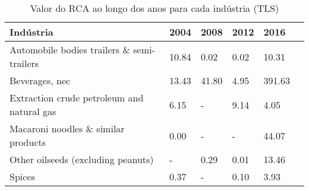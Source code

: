 \begin{table}
\centering
\caption{Valor do RCA ao longo dos anos para cada indústria (TLS)}
\begin{tabular}{p{6cm}p{1.5cm}p{1.5cm}p{1.5cm}p{1.5cm}p{1.5cm}}
\toprule
                                 Indústria &  2004 &  2008 & 2012 &   2016 \\
\midrule
Automobile bodies trailers \& semi-trailers & 10.84 &  0.02 & 0.02 &  10.31 \\
                            Beverages, nec & 13.43 & 41.80 & 4.95 & 391.63 \\
Extraction crude petroleum and natural gas &  6.15 &     - & 9.14 &   4.05 \\
       Macaroni noodles \& similar products &  0.00 &     - &    - &  44.07 \\
        Other oilseeds (excluding peanuts) &     - &  0.29 & 0.01 &  13.46 \\
                                    Spices &  0.37 &     - & 0.10 &   3.93 \\
\bottomrule
\end{tabular}
\end{table}
